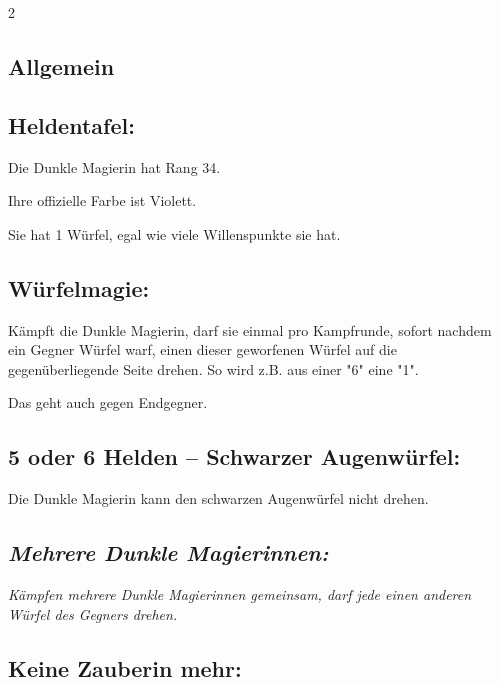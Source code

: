 \documentclass[10pt, a4paper, oneside]{book}
\newcommand{\fan}[1]{\textit{#1}}
\begin{document}
\begin{multicols*}{2}\raggedcolumns


\begin{nobgcolor}

\section{Allgemein}


\subsection{Heldentafel:}

Die Dunkle Magierin hat Rang 34.

Ihre offizielle Farbe ist Violett.

Sie hat 1 Würfel, egal wie viele Willenspunkte sie hat.




\subsection{Würfelmagie:}

Kämpft die Dunkle Magierin, darf sie einmal pro Kampfrunde, sofort nachdem ein Gegner Würfel warf, einen dieser geworfenen Würfel auf die gegenüberliegende Seite drehen. So wird z.B. aus einer "6" eine "1".

Das geht auch gegen Endgegner.



\subsection{5 oder 6 Helden – Schwarzer Augenwürfel:}

Die Dunkle Magierin kann den schwarzen Augenwürfel nicht drehen.




\subsection{\fan{Mehrere Dunkle Magierinnen:}}

\fan{Kämpfen mehrere Dunkle Magierinnen gemeinsam, darf jede einen anderen Würfel des Gegners drehen.}




\subsection{Keine Zauberin mehr:}


\end{nobgcolor}
\end{multicols*}
\end{document}
